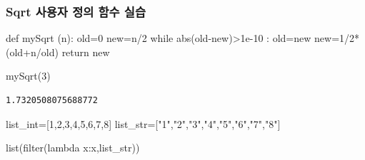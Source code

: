 \documentclass[
  letterpaper,
  DIV=11,
  numbers=noendperiod]{scrreprt}
\newenvironment{Shaded}{\begin{snugshade}}{\end{snugshade}}
\newcommand{\BuiltInTok}[1]{\textcolor[rgb]{0.00,0.23,0.31}{#1}}
\newcommand{\ControlFlowTok}[1]{\textcolor[rgb]{0.00,0.23,0.31}{#1}}
\newcommand{\DecValTok}[1]{\textcolor[rgb]{0.68,0.00,0.00}{#1}}
\newcommand{\FloatTok}[1]{\textcolor[rgb]{0.68,0.00,0.00}{#1}}
\newcommand{\KeywordTok}[1]{\textcolor[rgb]{0.00,0.23,0.31}{#1}}
\newcommand{\NormalTok}[1]{\textcolor[rgb]{0.00,0.23,0.31}{#1}}
\newcommand{\OperatorTok}[1]{\textcolor[rgb]{0.37,0.37,0.37}{#1}}
\newcommand{\StringTok}[1]{\textcolor[rgb]{0.13,0.47,0.30}{#1}}
\begin{document}
\subsubsection{Sqrt 사용자 정의 함수
실습}\label{sqrt-uxc0acuxc6a9uxc790-uxc815uxc758-uxd568uxc218-uxc2e4uxc2b5}

\begin{Shaded}
\begin{Highlighting}[]
\KeywordTok{def}\NormalTok{ mySqrt (n):}
\NormalTok{    old}\OperatorTok{=}\DecValTok{0}
\NormalTok{    new}\OperatorTok{=}\NormalTok{n}\OperatorTok{/}\DecValTok{2}
    \ControlFlowTok{while} \BuiltInTok{abs}\NormalTok{(old}\OperatorTok{{-}}\NormalTok{new)}\OperatorTok{\textgreater{}}\FloatTok{1e{-}10}\NormalTok{ :}
\NormalTok{        old}\OperatorTok{=}\NormalTok{new}
\NormalTok{        new}\OperatorTok{=}\DecValTok{1}\OperatorTok{/}\DecValTok{2}\OperatorTok{*}\NormalTok{(old}\OperatorTok{+}\NormalTok{n}\OperatorTok{/}\NormalTok{old)}
    \ControlFlowTok{return}\NormalTok{ new}
\end{Highlighting}
\end{Shaded}

\begin{Shaded}
\begin{Highlighting}[]
\NormalTok{mySqrt(}\DecValTok{3}\NormalTok{)}
\end{Highlighting}
\end{Shaded}

\begin{verbatim}
1.7320508075688772
\end{verbatim}

\begin{Shaded}
\begin{Highlighting}[]
\NormalTok{list\_int}\OperatorTok{=}\NormalTok{[}\DecValTok{1}\NormalTok{,}\DecValTok{2}\NormalTok{,}\DecValTok{3}\NormalTok{,}\DecValTok{4}\NormalTok{,}\DecValTok{5}\NormalTok{,}\DecValTok{6}\NormalTok{,}\DecValTok{7}\NormalTok{,}\DecValTok{8}\NormalTok{]}
\NormalTok{list\_str}\OperatorTok{=}\NormalTok{[}\StringTok{"1"}\NormalTok{,}\StringTok{"2"}\NormalTok{,}\StringTok{"3"}\NormalTok{,}\StringTok{"4"}\NormalTok{,}\StringTok{"5"}\NormalTok{,}\StringTok{"6"}\NormalTok{,}\StringTok{"7"}\NormalTok{,}\StringTok{"8"}\NormalTok{]}
\end{Highlighting}
\end{Shaded}

\begin{Shaded}
\begin{Highlighting}[]
\BuiltInTok{list}\NormalTok{(}\BuiltInTok{filter}\NormalTok{(}\KeywordTok{lambda}\NormalTok{ x:x,list\_str))}
\end{Highlighting}
\end{Shaded}
\end{document}
